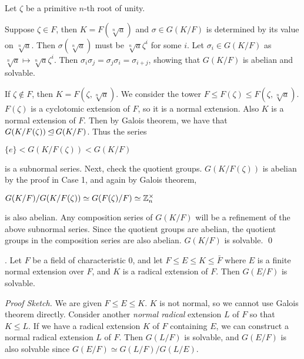 \pf Let \(\zeta\) be a primitive \(n\)-th root of unity.

 Suppose \(\zeta \in F\), then \(K = F(\sqrt[n]{a})\) and \(\sigma \in G(K/F)\) is determined by its value on \(\sqrt[n]{a}\). Then \(\sigma(\sqrt[n]{a})\) must be \(\sqrt[n]{a}\zeta^i\) for some \(i\). Let \(\sigma_i \in G(K/F)\) as \(\sqrt[n]{a} \mapsto \sqrt[n]{a}\zeta^i\). Then \(\sigma_i \sigma_j = \sigma_j \sigma_i = \sigma_{i+j}\), showing that \(G(K/F)\) is abelian and solvable.

 If \(\zeta \notin F\), then \(K = F(\zeta, \sqrt[n]{a})\). We consider the tower \(F \leq F(\zeta) \leq F(\zeta, \sqrt[n]{a})\). \(F(\zeta)\) is a cyclotomic extension of \(F\), so it is a normal extension. Also \(K\) is a normal extension of \(F\). Then by Galois theorem, we have that \(G(K/F(\zeta)) \unlhd G(K/F)\). Thus the series
\begin{center}
    \(\{e\} < G(K/F(\zeta)) < G(K/F)\)
\end{center}
is a subnormal series. Next, check the quotient groups. \(G(K/F(\zeta))\) is abelian by the proof in Case 1, and again by Galois theorem,
\begin{center}
    \(G(K/F) / G(K/F(\zeta)) \simeq G(F(\zeta)/F) \simeq \mathbb{Z}_n^\times\)
\end{center}
is also abelian. Any composition series of \(G(K/F)\) will be a refinement of the above subnormal series. Since the quotient groups are abelian, the quotient groups in the composition series are also abelian. \(G(K/F)\) is solvable. \qed

\thm. Let \(F\) be a field of characteristic \(0\), and let \(F \leq E \leq K \leq \bar{F}\) where \(E\) is a finite normal extension over \(F\), and \(K\) is a radical extension of \(F\). Then \(G(E/F)\) is solvable.

\textit{Proof Sketch.} We are given \(F \leq E \leq K\). \(K\) is not normal, so we cannot use Galois theorem directly. Consider another \textit{normal radical} extension \(L\) of \(F\) so that \(K \leq L\). If we have a radical extension \(K\) of \(F\) containing \(E\), we can construct a normal radical extension \(L\) of \(F\). Then \(G(L/F)\) is solvable, and \(G(E/F)\) is also solvable since \(G(E/F) \simeq G(L/F)/G(L/E)\).

